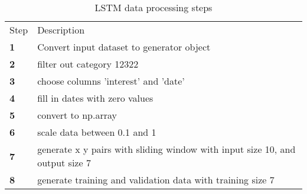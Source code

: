 \begin{table}[h]
  \caption{LSTM data processing steps}
  \label{table:lstm_data_processing_steps}
  \begin{tabular}{ll}
    \toprule
    Step       & Description                                                                  \\
    \textbf{1} & Convert input dataset to generator object                                    \\
    \textbf{2} & filter out category 12322                                                    \\
    \textbf{3} & choose columns 'interest' and 'date'                                         \\
    \textbf{4} & fill in dates with zero values                                               \\
    \textbf{5} & convert to np.array                                                          \\
    \textbf{6} & scale data between 0.1 and 1                                                 \\
    \textbf{7} & generate x y pairs with sliding window with input size 10, and output size 7 \\
    \textbf{8} & generate training and validation data with training size 7                   \\
    \bottomrule
  \end{tabular}
\end{table}

